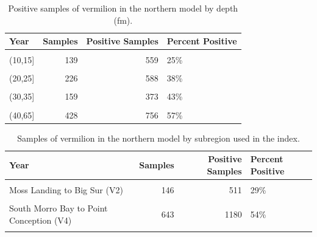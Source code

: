 \documentclass[11pt,
  english,
  a4paper,
]{article}
\begin{document}
\begin{table}

\caption{\label{tab:tab-depth-cpfvonboard}Positive samples of vermilion in the northern model by depth (fm).}
\centering
\begin{tabular}[t]{lrrl}
\toprule
Year & Samples & Positive Samples & Percent Positive\\
\midrule
\cellcolor{gray!6}{(0,10]} & \cellcolor{gray!6}{40} & \cellcolor{gray!6}{346} & \cellcolor{gray!6}{12\%}\\
(10,15] & 139 & 559 & 25\%\\
\cellcolor{gray!6}{(15,20]} & \cellcolor{gray!6}{279} & \cellcolor{gray!6}{808} & \cellcolor{gray!6}{35\%}\\
(20,25] & 226 & 588 & 38\%\\
\cellcolor{gray!6}{(25,30]} & \cellcolor{gray!6}{219} & \cellcolor{gray!6}{601} & \cellcolor{gray!6}{36\%}\\
\addlinespace
(30,35] & 159 & 373 & 43\%\\
\cellcolor{gray!6}{(35,40]} & \cellcolor{gray!6}{216} & \cellcolor{gray!6}{450} & \cellcolor{gray!6}{48\%}\\
(40,65] & 428 & 756 & 57\%\\
\bottomrule
\end{tabular}
\end{table}

\FloatBarrier

\begin{table}

\caption{\label{tab:tab-region-cpfvonboard}Samples of vermilion in the northern model by subregion used in the index.}
\centering
\begin{tabular}[t]{lrrl}
\toprule
Year & Samples & Positive Samples & Percent Positive\\
\midrule
\cellcolor{gray!6}{CA/OR border to Santa Cruz (V1)} & \cellcolor{gray!6}{238} & \cellcolor{gray!6}{1213} & \cellcolor{gray!6}{20\%}\\
Moss Landing to Big Sur (V2) & 146 & 511 & 29\%\\
\cellcolor{gray!6}{San Luis Obsipso to Morro Bay (V3)} & \cellcolor{gray!6}{591} & \cellcolor{gray!6}{1044} & \cellcolor{gray!6}{57\%}\\
South Morro Bay to Point Conception (V4) & 643 & 1180 & 54\%\\
\cellcolor{gray!6}{Offshore (V5)} & \cellcolor{gray!6}{88} & \cellcolor{gray!6}{533} & \cellcolor{gray!6}{17\%}\\
\bottomrule
\end{tabular}
\end{table}
\end{document}
